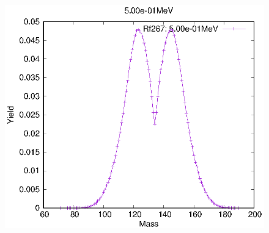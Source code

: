 \begin{figure}[htbp]
\begin{minipage}{0.33\textwidth} \begin{center} \includegraphics[width=\textwidth]{YA/Rf267_5.00e-01.eps} \end{center} \end{minipage}
\end{figure}

